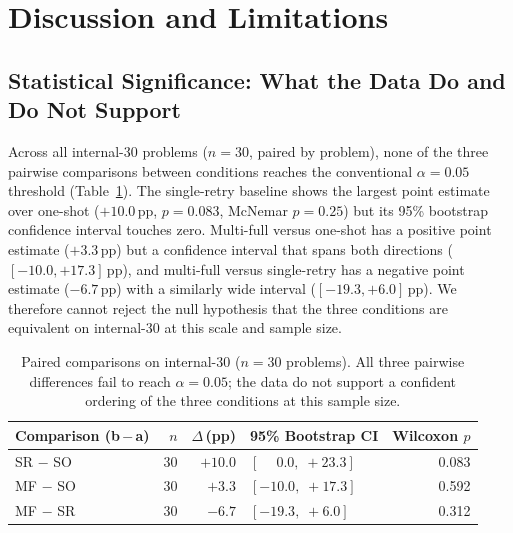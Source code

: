 \documentclass[journal]{IEEEtran}
\begin{document}
\section{Discussion and Limitations}\label{sec:discussion}

\subsection{Statistical Significance: What the Data Do and Do Not Support}
Across all internal-30 problems ($n{=}30$, paired by problem), none of the three pairwise comparisons between conditions reaches the conventional $\alpha=0.05$ threshold (Table~\ref{tab:paired_stats}). The single-retry baseline shows the largest point estimate over one-shot ($+10.0$\,pp, $p{=}0.083$, McNemar $p{=}0.25$) but its 95\% bootstrap confidence interval touches zero. Multi-full versus one-shot has a positive point estimate ($+3.3$\,pp) but a confidence interval that spans both directions ($[-10.0, +17.3]$\,pp), and multi-full versus single-retry has a negative point estimate ($-6.7$\,pp) with a similarly wide interval ($[-19.3, +6.0]$\,pp). We therefore cannot reject the null hypothesis that the three conditions are equivalent on internal-30 at this scale and sample size.

\begin{table}[!t]
\caption{Paired comparisons on internal-30 ($n{=}30$ problems). All three pairwise differences fail to reach $\alpha=0.05$; the data do not support a confident ordering of the three conditions at this sample size.}
\label{tab:paired_stats}
\centering
\footnotesize
\begin{tabular}{@{}lrrlr@{}}
\toprule
Comparison (b\,$-$\,a) & $n$ & $\Delta$\,(pp) & 95\% Bootstrap CI & Wilcoxon $p$ \\
\midrule
SR $-$ SO & 30 & $+10.0$ & $[\phantom{+}0.0,\;+23.3]$ & 0.083 \\
MF $-$ SO & 30 & $+3.3$  & $[-10.0,\;+17.3]$          & 0.592 \\
MF $-$ SR & 30 & $-6.7$  & $[-19.3,\;+6.0]$           & 0.312 \\
\bottomrule
\end{tabular}
\end{table}
\end{document}
